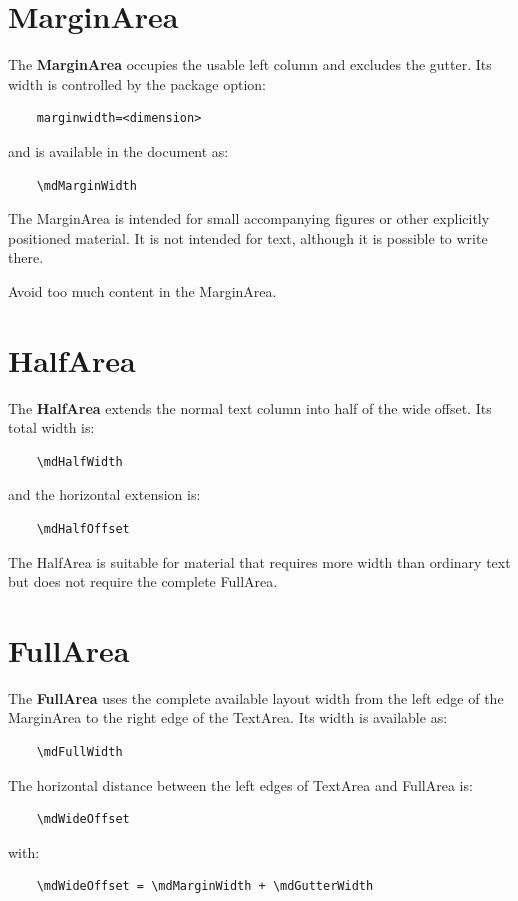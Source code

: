 \documentclass[
11pt,
a4paper,
oneside
]{scrbook}
\begin{document}
\section{MarginArea}

The \textbf{MarginArea} occupies the usable left column and excludes the
gutter.
Its width is controlled by the package option:

\begin{verbatim}
	marginwidth=<dimension>
\end{verbatim}
and is available in the document as:
\begin{verbatim}
	\mdMarginWidth
\end{verbatim}
The MarginArea is intended for small accompanying figures or other explicitly
positioned material. It is not intended for text, although it is possible to write there.

\begin{MarginArea}
	\begin{warning}
		Avoid too much content in the MarginArea.
	\end{warning}
\end{MarginArea}

\section{HalfArea}
\begin{HalfArea}
The \textbf{HalfArea} extends the normal text column into half of the wide
offset.
Its total width is:
\begin{verbatim}
	\mdHalfWidth
\end{verbatim}
and the horizontal extension is:
\begin{verbatim}
	\mdHalfOffset
\end{verbatim}
The HalfArea is suitable for material that requires more width than ordinary
text but does not require the complete FullArea.
\end{HalfArea}

\section{FullArea}
\begin{FullArea}
The \textbf{FullArea} uses the complete available layout width from the left
edge of the MarginArea to the right edge of the TextArea.
Its width is available as:
\begin{verbatim}
	\mdFullWidth
\end{verbatim}
The horizontal distance between the left edges of TextArea and FullArea is:
\begin{verbatim}
	\mdWideOffset
\end{verbatim}
with:
\begin{verbatim}
	\mdWideOffset = \mdMarginWidth + \mdGutterWidth
\end{verbatim}
\end{FullArea}
\end{document}
